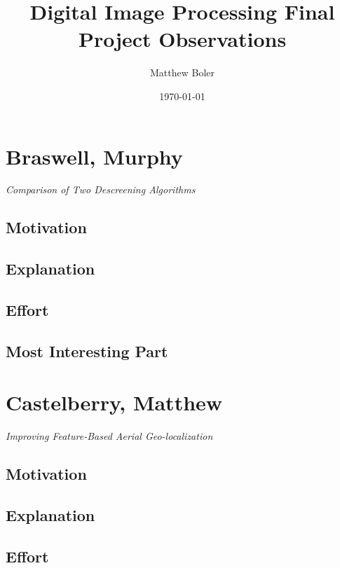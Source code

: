 \documentclass[12pt]{article}
\title{Digital Image Processing Final Project Observations}
\author{Matthew Boler}
\date{\today}
\begin{document}
\maketitle


\newpage
\section{Braswell, Murphy}

\textit{Comparison of Two Descreening Algorithms}

\subsection{Motivation}

\subsection{Explanation}

\subsection{Effort}

\subsection{Most Interesting Part}

\newpage
\section{Castelberry, Matthew}

\textit{Improving Feature-Based Aerial Geo-localization}

\subsection{Motivation}

\subsection{Explanation}

\subsection{Effort}
\end{document}
